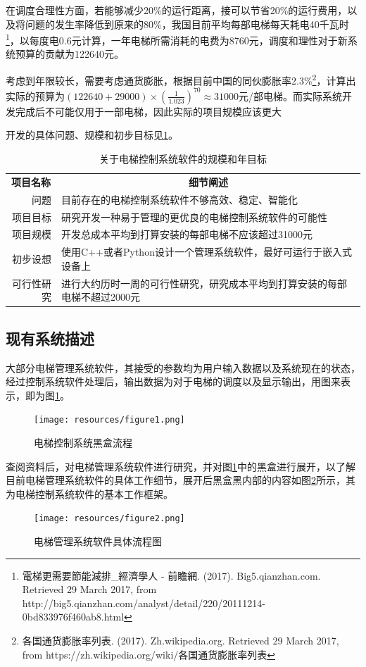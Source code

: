 在调度合理性方面，若能够减少20\%的运行距离，接可以节省20\%的运行费用，以及将问题的发生率降低到原来的80\%，我国目前平均每部电梯每天耗电40千瓦时\footnote{電梯更需要節能減排\_經濟學人 - 前瞻網. (2017). Big5.qianzhan.com. Retrieved 29 March 2017, from http://big5.qianzhan.com/analyst/detail/220/20111214-0bd833976f460ab8.html}，以每度电0.6元计算，一年电梯所需消耗的电费为8760元，调度和理性对于新系统预算的贡献为122640元。\

考虑到年限较长，需要考虑通货膨胀，根据目前中国的同伙膨胀率2.3\%\footnote{各国通货膨胀率列表. (2017). Zh.wikipedia.org. Retrieved 29 March 2017, from https://zh.wikipedia.org/wiki/各国通货膨胀率列表}，计算出实际的预算为$(122640+29000)\times(\frac{1}{1.023})^{70} \approx 31000$元/部电梯。而实际系统开发完成后不可能仅用于一部电梯，因此实际的项目规模应该更大

开发的具体问题、规模和初步目标见\ref{tab:definitionTable}。
\begin{table}[H]
	\centering
	\caption{关于电梯控制系统软件的规模和年目标}
	\label{tab:definitionTable}
	\begin{tabular}{rl}
		\toprule
		\multicolumn{1}{c}{\textbf{项目名称}} & \multicolumn{1}{c}{\textbf{细节阐述}}\\ \cmidrule(rl){1-1} \cmidrule(rl){2-2}
		问题 & 目前存在的电梯控制系统软件不够高效、稳定、智能化\\
		项目目标 & 研究开发一种易于管理的更优良的电梯控制系统软件的可能性\\
		项目规模 & 开发总成本平均到打算安装的每部电梯不应该超过31000元 \\
		初步设想 & 使用C++或者Python设计一个管理系统软件，最好可运行于嵌入式设备上\\
		可行性研究 & 进行大约历时一周的可行性研究，研究成本平均到打算安装的每部电梯不超过2000元\\
		\bottomrule
	\end{tabular}
\end{table}

\begin{minipage}{\textwidth}
\subsection{现有系统描述}
大部分电梯管理系统软件，其接受的参数均为用户输入数据以及系统现在的状态，经过控制系统软件处理后，输出数据为对于电梯的调度以及显示输出，用图来表示，即为图\ref{fig:figure1}。\par
\begin{figure}[H]
	\centering
	\texttt{[image: resources/figure1.png]}
	\caption{电梯控制系统黑盒流程}
	\label{fig:figure1}
\end{figure} \par

查阅资料后，对电梯管理系统软件进行研究，并对图\ref{fig:figure1}中的黑盒进行展开，以了解目前电梯管理系统软件的具体工作细节，展开后黑盒黑内部的内容如图\ref{fig:figure2}所示，其为电梯控制系统软件的基本工作框架。
\begin{figure}[H]
	\centering
	\texttt{[image: resources/figure2.png]}
	\caption{电梯管理系统软件具体流程图}
	\label{fig:figure2}
\end{figure} \par
\end{minipage}

